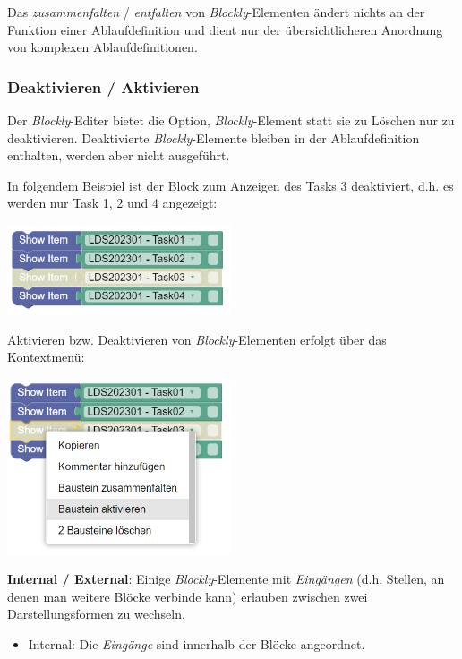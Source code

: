 \documentclass[
  letterpaper,
  DIV=11]{scrreprt}
\providecommand{\tightlist}{%
  \setlength{\itemsep}{0pt}\setlength{\parskip}{0pt}}\usepackage{longtable,booktabs,array}
\begin{document}
\begin{tcolorbox}
Das \emph{zusammenfalten} / \emph{entfalten} von
\emph{Blockly}-Elementen ändert nichts an der Funktion einer
Ablaufdefinition und dient nur der übersichtlicheren Anordnung von
komplexen Ablaufdefinitionen.

\hypertarget{deaktivieren-aktivieren-1}{%
\subsubsection{Deaktivieren /
Aktivieren}\label{deaktivieren-aktivieren-1}}

Der \emph{Blockly}-Editer bietet die Option, \emph{Blockly}-Element
statt sie zu Löschen nur zu deaktivieren. Deaktivierte
\emph{Blockly}-Elemente bleiben in der Ablaufdefinition enthalten,
werden aber nicht ausgeführt.

In folgendem Beispiel ist der Block zum Anzeigen des Tasks 3
deaktiviert, d.h. es werden nur Task 1, 2 und 4 angezeigt:

\includegraphics[width=2.60417in,height=\textheight]{img/screenshot-blockly-example-deactivated-blocks-01-ENG.png}

Aktivieren bzw. Deaktivieren von \emph{Blockly}-Elementen erfolgt über
das Kontextmenü:

\includegraphics[width=2.60417in,height=\textheight]{img/screenshot-blockly-example-activate-deactivated-blocks-01-ENG.png}

\textbf{Internal / External}: Einige \emph{Blockly}-Elemente mit
\emph{Eingängen} (d.h. Stellen, an denen man weitere Blöcke verbinde
kann) erlauben zwischen zwei Darstellungsformen zu wechseln.

\begin{itemize}
\tightlist
\item
  Internal: Die \emph{Eingänge} sind innerhalb der Blöcke angeordnet.
\end{itemize}


\end{tcolorbox}
\end{document}
